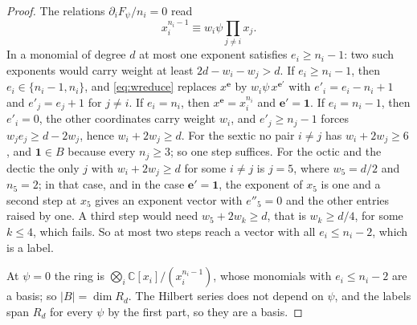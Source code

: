 \documentclass[11pt]{amsart}
\theoremstyle{definition}
\theoremstyle{remark}
\newcommand{\C}{\mathbb{C}}
\newcommand{\ee}{\mathbf{e}}
\newcommand{\one}{\mathbf{1}}
\begin{document}
\begin{proof}
The relations $\partial_iF_\psi/n_i=0$ read
\begin{equation}\label{eq:wreduce}
x_i^{n_i-1}\equiv w_i\psi\prod_{j\ne i}x_j .
\end{equation}
In a monomial of degree $d$ at most one exponent satisfies $e_i\ge n_i-1$:
two such exponents would carry weight at least $2d-w_i-w_j>d$. If
$e_i\ge n_i-1$, then $e_i\in\{n_i-1,n_i\}$, and \eqref{eq:wreduce} replaces
$x^{\ee}$ by $w_i\psi\,x^{\ee'}$ with $e'_i=e_i-n_i+1$ and $e'_j=e_j+1$ for
$j\ne i$. If $e_i=n_i$, then $x^{\ee}=x_i^{n_i}$ and $\ee'=\one$. If
$e_i=n_i-1$, then $e'_i=0$, the other coordinates carry weight $w_i$, and
$e'_j\ge n_j-1$ forces $w_je_j\ge d-2w_j$, hence $w_i+2w_j\ge d$. For the
sextic no pair $i\ne j$ has $w_i+2w_j\ge6$, and $\one\in B$ because every
$n_j\ge3$; so one step suffices. For the octic and the dectic the only $j$
with $w_i+2w_j\ge d$ for some $i\ne j$ is $j=5$, where $w_5=d/2$ and
$n_5=2$; in that case, and in the case $\ee'=\one$, the exponent of $x_5$
is one and a second step at $x_5$ gives an exponent vector with $e''_5=0$
and the other entries raised by one. A third step would need $w_5+2w_k\ge
d$, that is $w_k\ge d/4$, for some $k\le4$, which fails. So at most two
steps reach a vector with all $e_i\le n_i-2$, which is a label.

At $\psi=0$ the ring is $\bigotimes_i\C[x_i]/(x_i^{n_i-1})$, whose
monomials with $e_i\le n_i-2$ are a basis; so $|B|=\dim R_d$. The Hilbert
series does not depend on $\psi$, and the labels span $R_d$ for every
$\psi$ by the first part, so they are a basis.
\end{proof}
\end{document}
